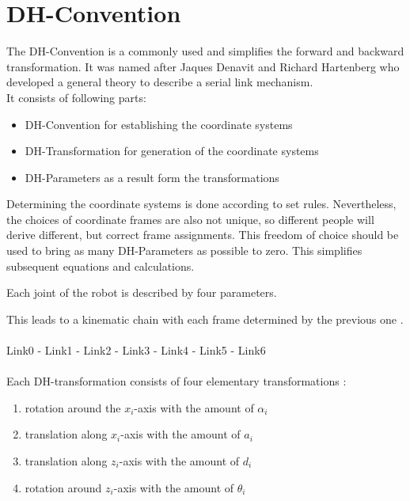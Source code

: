 \chapter{\ac{DH}-Convention} \label{sec:DH-convention}

The \ac{DH}-Convention is a commonly used and simplifies the forward and backward transformation. It was named after Jaques Denavit and Richard Hartenberg who developed a general theory to describe a serial link mechanism. \cite{DenavitHartenbergLesson}\\
It consists of following parts:

\begin{itemize}[leftmargin=3cm]
	\item \ac{DH}-Convention for establishing the coordinate systems
	\item \ac{DH}-Transformation for generation of the coordinate systems
	\item \ac{DH}-Parameters as a result form the transformations
\end{itemize}

Determining the coordinate systems is done according to set rules. Nevertheless, the choices of coordinate frames are also not unique, so different people will derive different, but correct frame assignments. This freedom of choice should be used to bring as many \ac{DH}-Parameters as possible to zero. This simplifies subsequent equations and calculations. \cite{DenavitHartenbergKonventionen}

Each joint of the robot is described by four parameters.

This leads to a kinematic chain with each frame determined by the previous one \cite{DenavitHartenbergKonventionen}.\\
\\

Link0 - Link1 - Link2 - Link3 - Link4 - Link5 - Link6\\
\\

Each \ac{DH}-transformation consists of four elementary transformations \cite{DenavitHartenbergKonventionen}:

\begin{enumerate}[label=\emph{\arabic*)}]
	\item rotation around the $x_i$-axis with the amount of $\alpha_i$
	\item translation along $x_i$-axis with the amount of  $a_i$
	\item translation along $z_i$-axis with the amount of  $d_i$
	\item rotation around $z_i$-axis with the amount of  $\theta_i$
\end{enumerate}

